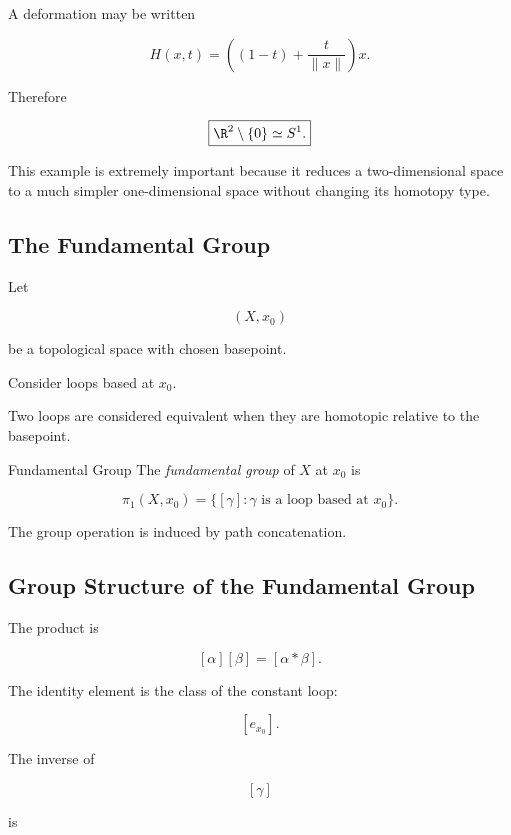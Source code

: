 A deformation may be written

\[
\boxed{
H(x,t)
=
\left(
(1-t)+\frac{t}{\|x\|}
\right)x.
}
\]

Therefore

\[
\boxed{
\R^2\setminus\{0\}
\simeq
S^1.
}
\]

This example is extremely important because it reduces a two-dimensional
space to a much simpler one-dimensional space without changing its homotopy
type.

\subsection{The Fundamental Group}
\label{subsec:fundamental-group}

Let

\[
(X,x_0)
\]

be a topological space with chosen basepoint.

Consider loops based at \(x_0\).

Two loops are considered equivalent when they are homotopic relative to the
basepoint.

\begin{definitionbox}{Fundamental Group}
The \emph{fundamental group} of \(X\) at \(x_0\) is

\[
\boxed{
\pi_1(X,x_0)
=
\{
[\gamma]:
\gamma
\text{ is a loop based at }x_0
\}.
}
\]

The group operation is induced by path concatenation.
\end{definitionbox}

\subsection{Group Structure of the Fundamental Group}
\label{subsec:fundamental-group-structure}

The product is

\[
\boxed{
[\alpha][\beta]
=
[\alpha*\beta].
}
\]

The identity element is the class of the constant loop:

\[
\boxed{
[e_{x_0}].
}
\]

The inverse of

\[
[\gamma]
\]

is

